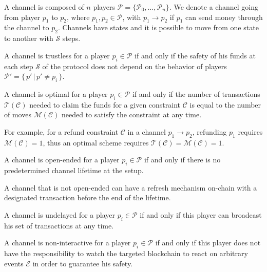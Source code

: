 \documentclass{llncs}
\begin{document}
A channel is composed of $n$ players $\mathcal{P} = \{\mathcal{P}_0, \dots, \mathcal{P}_n\}$. We denote a channel going from player $p_1$ to $p_2$, where $p_1, p_2 \in \mathcal{P}$, with $p_1 \rightarrow p_2$ if $p_1$ can send money through the channel to $p_2$. Channels have states and it is possible to move from one state to another with $\mathcal{S}$ steps.

\begin{definition}[Trustless] A channel is trustless for a player $p_i \in \mathcal{P}$ if and only if the safety of his funds at each step $\mathcal{S}$ of the protocol does not depend on the behavior of players $\mathcal{P}' = \{\, p' \, | \, p' \neq p_i \, \}$.
\end{definition}

\begin{definition}[Optimal] A channel is optimal for a player $p_i \in \mathcal{P}$ if and only if the number of transactions $\mathcal{T}(\mathcal{C})$ needed to claim the funds for a given constraint $\mathcal{C}$ is equal to the number of moves $\mathcal{M}(\mathcal{C})$ needed to satisfy the constraint at any time.
\end{definition}

For example, for a refund constraint $\mathcal{C}$ in a channel $p_1 \rightarrow p_2$, refunding $p_1$ requires $\mathcal{M}(\mathcal{C}) = 1$, thus an optimal scheme requires $\mathcal{T}(\mathcal{C}) = \mathcal{M}(\mathcal{C}) = 1$.

\begin{definition} A channel is open-ended for a player $p_i \in \mathcal{P}$ if and only if there is no predetermined channel lifetime at the setup.
\end{definition}

A channel that is not open-ended can have a refresh mechanism on-chain with a designated transaction before the end of the lifetime.

\begin{definition}[Undelayed] A channel is undelayed for a player $p_i \in \mathcal{P}$ if and only if this player can broadcast his set of transactions at any time.
\end{definition}

\begin{definition} A channel is non-interactive for a player $p_i \in \mathcal{P}$ if and only if this player does not have the responsibility to watch the targeted blockchain to react on arbitrary events $\mathcal{E}$ in order to guarantee his safety.
\end{definition}
\end{document}
